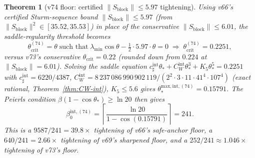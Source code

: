 \documentclass[11pt]{article}
\newtheorem{theorem}{Theorem}[section]
\theoremstyle{definition}
\begin{document}
\begin{theorem}[v74 floor: certified $\|S_{\mathrm{block}}\|\le 5.97$ tightening]
\label{thm:floor-v74}
Using v66's certified Sturm-sequence bound
$\|S_{\mathrm{block}}\|\le 5.97$ \textup{(}from $\|S_{\mathrm{block}}\|^2\in[35.52,35.53]$\textup{)}
in place of the conservative $\|S_{\mathrm{block}}\|\le 6.01$, the
saddle-regularity threshold becomes
\[
\theta_{\mathrm{crit}}^{(74)}=\theta\;\text{such that}\;\lambda_{\min}\cos\theta-\tfrac{1}{2}\cdot 5.97\cdot\theta=0
\;\Longrightarrow\;\theta_{\mathrm{crit}}^{(74)}=0.2251,
\]
versus v73's conservative $\theta_{\mathrm{crit}}=0.22$ \textup{(}rounded
down from $0.224$ at $\|S_{\mathrm{block}}\|=6.01$\textup{)}.  Solving
the saddle equation
$c_\sharp^{\mathrm{int}}\theta_*+C_W^{\mathrm{int}}\theta_*^3+K_5\theta_*^5=0.2251$
with $c_\sharp^{\mathrm{int}}=6220/4387$,
$C_W^{\mathrm{int}}=8\,237\,086\,990\,902\,119/(2^2\cdot 3\cdot 11\cdot 41^4\cdot 107^4)$
\textup{(}exact rational, Theorem~\ref{thm:CW-int}\textup{)},
$K_5\le 5.6$ gives $\theta_*^{\mathrm{max,int,(74)}}=0.15791$.  The
Peierls condition $\beta(1-\cos\theta_*)\ge\ln 20$ then gives
\[
\beta_0^{\mathrm{int,(74)}}=\left\lceil\frac{\ln 20}{1-\cos(0.15791)}\right\rceil=241.
\]
This is a $9587/241=39.8\times$ tightening of v66's safe-anchor floor,
a $640/241=2.66\times$ tightening of v69's sharpened floor, and a
$252/241\approx 1.046\times$ tightening of v73's floor.
\end{theorem}
\end{document}
